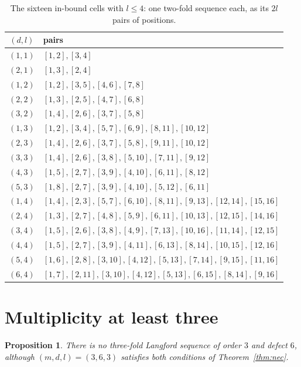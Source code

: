 \documentclass[11pt]{amsart}
\theoremstyle{plain}
\newtheorem{proposition}[theorem]{Proposition}
\theoremstyle{definition}
\theoremstyle{remark}
\begin{document}
\begin{table}[ht]
\centering\small
\caption{The sixteen in-bound cells with $l \le 4$: one two-fold sequence each, as its
$2l$ pairs of positions.}\label{tab:literals}
\begin{tabular}{@{}cl@{}}
\toprule
$(d,l)$ & pairs \\
\midrule
$(1,1)$ & $[1,2],[3,4]$ \\
$(2,1)$ & $[1,3],[2,4]$ \\
$(1,2)$ & $[1,2],[3,5],[4,6],[7,8]$ \\
$(2,2)$ & $[1,3],[2,5],[4,7],[6,8]$ \\
$(3,2)$ & $[1,4],[2,6],[3,7],[5,8]$ \\
$(1,3)$ & $[1,2],[3,4],[5,7],[6,9],[8,11],[10,12]$ \\
$(2,3)$ & $[1,4],[2,6],[3,7],[5,8],[9,11],[10,12]$ \\
$(3,3)$ & $[1,4],[2,6],[3,8],[5,10],[7,11],[9,12]$ \\
$(4,3)$ & $[1,5],[2,7],[3,9],[4,10],[6,11],[8,12]$ \\
$(5,3)$ & $[1,8],[2,7],[3,9],[4,10],[5,12],[6,11]$ \\
$(1,4)$ & $[1,4],[2,3],[5,7],[6,10],[8,11],[9,13],[12,14],[15,16]$ \\
$(2,4)$ & $[1,3],[2,7],[4,8],[5,9],[6,11],[10,13],[12,15],[14,16]$ \\
$(3,4)$ & $[1,5],[2,6],[3,8],[4,9],[7,13],[10,16],[11,14],[12,15]$ \\
$(4,4)$ & $[1,5],[2,7],[3,9],[4,11],[6,13],[8,14],[10,15],[12,16]$ \\
$(5,4)$ & $[1,6],[2,8],[3,10],[4,12],[5,13],[7,14],[9,15],[11,16]$ \\
$(6,4)$ & $[1,7],[2,11],[3,10],[4,12],[5,13],[6,15],[8,14],[9,16]$ \\
\bottomrule
\end{tabular}
\end{table}

\section{Multiplicity at least three}\label{sec:mge3}

\begin{proposition}\label{prop:sixthree}
There is no three-fold Langford sequence of order $3$ and defect $6$, although
$(m,d,l) = (3,6,3)$ satisfies both conditions of Theorem~\ref{thm:nec}.
\end{proposition}
\end{document}
